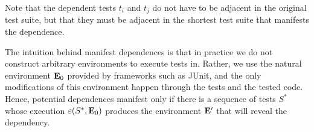 Note that the dependent tests $t_i$\/ and $t_j$ do not have to be
adjacent in the original test suite, but that they must be adjacent in
the shortest test suite that manifests the dependence.

The intuition behind manifest dependences is that in practice we
do not construct arbitrary environments to execute tests in. Rather,
we use the natural environment $\mathbf{E}_0$ provided by frameworks such as JUnit,
and the only modifications of this environment happen through the
tests and the tested code. Hence, potential dependences manifest only
if there is a sequence of tests $S^*$ whose execution
$\varepsilon(S^*,\mathbf{E}_0)$  produces the
environment $\mathbf{E}'$ that will reveal the dependency.

%

%
%
%

